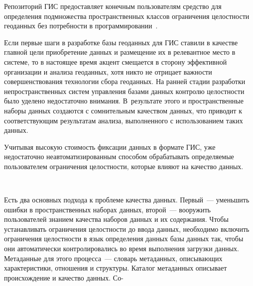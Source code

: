 \begin{multicols}{2}
      Репозиторий ГИС предоставляет конечным пользователям средство для 
определения подмножества пространственных классов ограничения целостности 
геоданных без потребности в программировании~\cite{5dul, 7dul}.
      
      Если первые шаги в разработке базы геоданных для ГИС ставили в качестве 
главной цели приобретение данных и размещение их в релевантное место в сис\-те\-ме, то в 
настоящее время акцент смещается в сторону эффективной организации и анализа 
геоданных, хотя никто не отрицает важности совершенствования технологии сбора 
геоданных. На ранней стадии разработки непространственных сис\-тем управления базами 
данных контролю целостности было уделено недостаточно внимания. В~результате этого 
и пространственные наборы данных создаются с сомнительным качеством данных, что 
приводит к соответствующим результатам анализа, выполненного с использованием 
таких данных.
      
      Учитывая высокую стоимость фиксации данных в формате ГИС, уже недостаточно 
неавтоматизированным способом обрабатывать определяемые пользователем ограничения 
целостности, которые влияют на качество данных. 

\begin{figure*} %
 \vspace*{1pt}
 \begin{center}
 \mbox{%
 \epsfxsize=114.043mm
 }
 \end{center}
 \vspace*{-9pt}
\vspace*{6pt}
\end{figure*}
      
      Есть два основных подхода к проблеме качества данных. Первый~--- уменьшить 
ошибки в пространственных наборах данных, второй~--- вооружить пользователей 
знанием качества наборов данных и их содержания. Чтобы устанавливать ограничения 
целостности до ввода данных, необходимо включить ограничения целостности в язык 
определения данных базы данных так, чтобы они автоматически контролировались во 
время выполнения загрузки данных. Метаданные для этого процесса~--- словарь 
метаданных, описывающих характеристики, отношения и структуры. Каталог метаданных 
описывает происхождение и качество данных. Со-\linebreak\vspace*{-12pt}

\pagebreak




\end{multicols}
